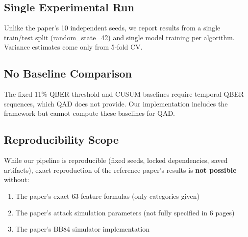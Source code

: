 \subsection{Single Experimental Run}
Unlike the paper's 10 independent seeds, we report results from a single train/test split (random\_state=42) and single model training per algorithm. Variance estimates come only from 5-fold CV.

\subsection{No Baseline Comparison}
The fixed 11\% QBER threshold and CUSUM baselines require temporal QBER sequences, which QAD does not provide. Our implementation includes the framework but cannot compute these baselines for QAD.

\subsection{Reproducibility Scope}
While our pipeline is reproducible (fixed seeds, locked dependencies, saved artifacts), exact reproduction of the reference paper's results is \textbf{not possible} without:
\begin{enumerate}
    \item The paper's exact 63 feature formulas (only categories given)
    \item The paper's attack simulation parameters (not fully specified in 6 pages)
    \item The paper's BB84 simulator implementation
\end{enumerate}